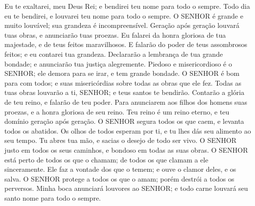 {\PP 
  Eu te exaltarei, meu Deus
{} Rei; e bendirei teu nome para todo o sempre.
  Todo dia eu te bendirei, e louvarei teu nome para todo o sempre.
  O SENHOR é grande e muito louvável; sua grandeza é incompreensível.
  Geração após geração louvará tuas obras, e anunciarão tuas proezas.
  Eu falarei da honra gloriosa de tua majestade, e de teus feitos maravilhosos.
  E falarão do poder de teus assombrosos feitos; e eu contarei tua grandeza.
  Declararão a lembrança de tua grande bondade; e anunciarão tua justiça alegremente.
  Piedoso e misericordioso é o SENHOR; ele demora para se irar, e tem grande bondade.
  O SENHOR é bom para com todos; e suas misericórdias
{} sobre todas as obras que ele fez.
  Todas as tuas obras louvarão a ti, SENHOR; e teus santos te bendirão.
  Contarão a glória de teu reino, e falarão de teu poder.
  Para anunciarem aos filhos dos homens suas proezas, e a honra gloriosa de seu reino.
  Teu reino é um reino eterno, e teu domínio
{} geração após geração.
  O SENHOR segura todos os que caem, e levanta todos os abatidos.
  Os olhos de todos esperam por ti, e tu lhes dás seu alimento ao seu tempo.
  Tu abres tua mão, e sacias o desejo de todo ser vivo.
  O SENHOR
{} justo em todos os seus caminhos, e bondoso em todas as suas obras.
  O SENHOR está perto de todos os que o chamam; de todos os que clamam a ele sinceramente.
  Ele faz a vontade dos que o temem; e ouve o clamor deles, e os salva.
  O SENHOR protege a todos os que o amam; porém destrói a todos os perversos.
  Minha boca anunciará louvores ao SENHOR; e todo
{} carne louvará seu santo nome para todo o sempre.
\par }


